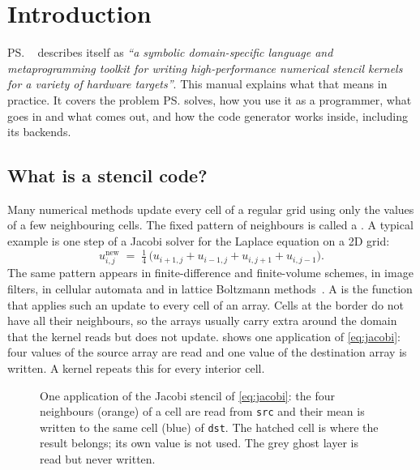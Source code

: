 \chapter{Introduction}\label{ch:introduction}

\ps{}~\cite{pystencils} describes itself as \emph{``a symbolic domain-specific language
and metaprogramming toolkit for writing high-performance numerical stencil kernels for a
variety of hardware targets''}. This manual explains what that means in practice. It
covers the problem \ps{} solves, how you use it as a programmer, what goes in and what
comes out, and how the code generator works inside, including its backends.

\section{What is a stencil code?}

Many numerical methods update every cell of a regular grid using only the values of a
few neighbouring cells. The fixed pattern of neighbours is called a . A
typical example is one step of a Jacobi solver for the Laplace equation on a 2D grid:
\begin{equation}
  u^{\text{new}}_{i,j} \;=\; \tfrac14\,\bigl(u_{i+1,j} + u_{i-1,j} + u_{i,j+1} + u_{i,j-1}\bigr).
  \label{eq:jacobi}
\end{equation}
The same pattern appears in finite-difference and finite-volume schemes, in image
filters, in cellular automata and in lattice Boltzmann methods~\cite{lbmpy}. A
 is the function that applies such an update to every cell of an
array. Cells at the border do not have all their neighbours, so the arrays usually carry
extra  around the domain that the kernel reads but does not update.
 shows one application of \cref{eq:jacobi}: four values of the
source array are read and one value of the destination array is written. A kernel
repeats this for every interior cell.

\begin{figure}[htbp]
  \centering
  
  \caption[One application of the Jacobi stencil]{One application of the Jacobi stencil of \cref{eq:jacobi}: the four neighbours (orange) of a cell are read from \texttt{src} and their mean is written to the same cell (blue) of \texttt{dst}. The hatched cell is where the result belongs; its own value is not used. The grey ghost layer is read but never written.}
  \label{fig:stencil}
\end{figure}

